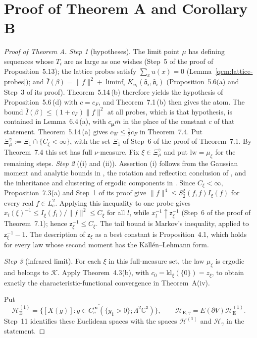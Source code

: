 \documentclass[11pt,letterpaper,reqno]{amsart}
\theoremstyle{definition}
\begin{document}
\section{Proof of Theorem A and Corollary B}
\begin{proof}[Proof of Theorem A]
\emph{Step 1} (hypotheses).
The limit point $\mu$ has defining sequences whose $T_i$ are as large as one wishes (Step~5 of the proof of Proposition~5.13);
the lattice probes satisfy $\sum_xu(x)=0$ (Lemma~\ref{qcm:lattice-probes});
and $\bar I(\beta)=\allowbreak \|f\|^2+\liminf_iK_{n_i}(\hat{\mathfrak a}_i,\allowbreak \hat{\mathfrak a}_i)$ (Proposition~5.6(a) and Step~3 of its proof).
Theorem~5.14\,(b) therefore yields the hypothesis of Proposition~5.6\,(d) with $c=c_F$, and Theorem~7.1\,(b) then gives the atom.
The bound $\bar I(\beta)\le(1+c_F)\|f\|^2$ at all probes, which is that hypothesis, is contained in Lemma~6.4\,(a), with $c_{\boldsymbol\mu}\bar m$ in the place of the constant $c$ of that statement.
Theorem~5.14\,(a) gives $c_W\le\frac12c_F$ in Theorem~7.4.
Put $\Xi^\gamma_\mu:=\Xi_1\cap\{C_\xi<\infty\}$, with the set $\Xi_1$ of Step~6 of the proof of Theorem~7.1. By Theorem~7.4 this set has full $\nu$-measure.
Fix $\xi\in\Xi^\gamma_\mu$ and put $\mathrm{lw}=\mu_\xi$ for the remaining steps.
\emph{Step 2} ((i) and (ii)).
Assertion (i) follows from the Gaussian moment and analytic bounds in \cite[Section~5]{QEDConstruction}, the rotation and reflection conclusion of \cite[Theorem~8.6]{QEDConstruction}, and the inheritance and clustering of ergodic components in \cite[Theorem~A]{ErgodicComponents}.
Since $C_\xi<\infty$, Proposition~7.3(a) and Step~1 of its proof give
$\|f\|^4\le S_2^\xi(f,f)I_\xi(f)$ for every real $f\in L^2_{\mathrm c}$.
Applying this inequality to one probe gives $x_l(\xi)^{-1}\le I_\xi(f_l)/\|f\|^2\le C_\xi$ for all $l$, while $x_l^{-1}\uparrow\mathsf z_\xi^{-1}$ (Step~6 of the proof of Theorem~7.1);
hence $\mathsf z_\xi^{-1}\le C_\xi$.
The tail bound is Markov's inequality, applied to $\mathsf z_\xi^{-1}-1$.
The description of $\mathsf z_\xi$ as a best constant is Proposition~4.1, which holds for every law whose second moment has the K\"all\'en--Lehmann form.

\emph{Step 3} (infrared limit).
For each $\xi$ in this full-measure set, the law $\mu_\xi$ is ergodic
and belongs to $\mathcal K$. Apply Theorem~4.3(b), with
$c_0=\mathrm{kl}_\xi(\{0\})=z_\xi$, to obtain exactly the
characteristic-functional convergence in Theorem~A(iv).

Put
\[
\mathcal H_{\mathrm E}^{(1)}=
\overline{\{[X(g)]:g\in C_c^\infty(\{y_1>0\};\Lambda^2\mathbb C^3)\}},
\qquad
\mathcal H_{\mathrm E,\gamma}=E(\partial V)\mathcal H_{\mathrm E}^{(1)}.
\]
Step~11 identifies these Euclidean spaces with the spaces
$\mathcal H^{(1)}$ and $\mathcal H_\gamma$ in the statement.


\end{proof}
\end{document}
